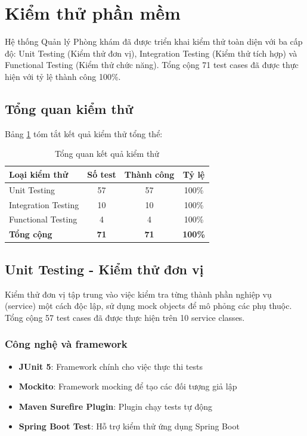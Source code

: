 \section{Kiểm thử phần mềm}

Hệ thống Quản lý Phòng khám đã được triển khai kiểm thử toàn diện với ba cấp độ: Unit Testing (Kiểm thử đơn vị), Integration Testing (Kiểm thử tích hợp) và Functional Testing (Kiểm thử chức năng). Tổng cộng 71 test cases đã được thực hiện với tỷ lệ thành công 100\%.

\subsection{Tổng quan kiểm thử}

Bảng \ref{tab:testing-summary} tóm tắt kết quả kiểm thử tổng thể:

\begin{table}[h]
\centering
\caption{Tổng quan kết quả kiểm thử}
\label{tab:testing-summary}
\begin{tabular}{|l|c|c|c|}
\hline
\textbf{Loại kiểm thử} & \textbf{Số test} & \textbf{Thành công} & \textbf{Tỷ lệ} \\
\hline
Unit Testing & 57 & 57 & 100\% \\
Integration Testing & 10 & 10 & 100\% \\
Functional Testing & 4 & 4 & 100\% \\
\hline
\textbf{Tổng cộng} & \textbf{71} & \textbf{71} & \textbf{100\%} \\
\hline
\end{tabular}
\end{table}

\subsection{Unit Testing - Kiểm thử đơn vị}

Kiểm thử đơn vị tập trung vào việc kiểm tra từng thành phần nghiệp vụ (service) một cách độc lập, sử dụng mock objects để mô phỏng các phụ thuộc. Tổng cộng 57 test cases đã được thực hiện trên 10 service classes.

\subsubsection{Công nghệ và framework}

\begin{itemize}
    \item \textbf{JUnit 5}: Framework chính cho việc thực thi tests
    \item \textbf{Mockito}: Framework mocking để tạo các đối tượng giả lập
    \item \textbf{Maven Surefire Plugin}: Plugin chạy tests tự động
    \item \textbf{Spring Boot Test}: Hỗ trợ kiểm thử ứng dụng Spring Boot
\end{itemize}

